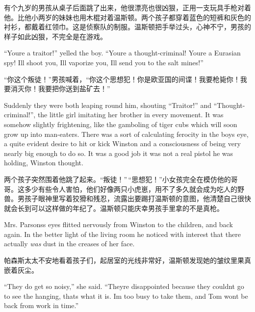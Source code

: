 \begin{paracol}{2}
\switchcolumn

有个九岁的男孩从桌子后面跳了出来，他很漂亮也很凶狠，正用一支玩具手枪对着他。比他小两岁的妹妹也用木棍对着温斯顿。两个孩子都穿着蓝色的短裤和灰色的衬衫，都戴着红领巾。这是侦察队的制服。温斯顿把手举过头，心神不宁，男孩的样子如此凶狠，不完全是在游戏。

\switchcolumn*

``You\textquotesingle re a traitor!'' yelled the boy.
``You\textquotesingle re a thought-criminal! You\textquotesingle re a
Eurasian spy! I\textquotesingle ll shoot you, I\textquotesingle ll
vaporize you, I\textquotesingle ll send you to the salt mines!''

\switchcolumn

``你这个叛徒！''男孩喊着，``你这个思想犯！你是欧亚国的间谍！我要枪毙你！我要消灭你！我要把你送到盐矿去！''

\switchcolumn*

Suddenly they were both leaping round him, shouting ``Traitor!'' and
``Thought-criminal!'', the little girl imitating her brother in every
movement. It was somehow slightly frightening, like the gamboling of
tiger cubs which will soon grow up into man-eaters. There was a sort of
calculating ferocity in the boy\textquotesingle s eye, a quite evident
desire to hit or kick Winston and a consciousness of being very nearly
big enough to do so. It was a good job it was not a real pistol he was
holding, Winston thought.

\switchcolumn

两个孩子突然围着他跳了起来。``叛徒！''\,``思想犯！''小女孩完全在模仿他的哥哥。这多少有些令人害怕，他们好像两只小虎崽，用不了多久就会成为吃人的野兽。男孩子眼神里写着狡猾和残忍，流露出要踢打温斯顿的意图，他清楚自己很快就会长到可以这样做的年纪了。温斯顿只能庆幸男孩手里拿的不是真枪。

\switchcolumn*

Mrs. Parsons\textquotesingle s eyes flitted nervously from Winston to
the children, and back again. In the better light of the living room he
noticed with interest that there actually \emph{was} dust in the creases
of her face.

\switchcolumn

帕森斯太太不安地看着孩子们，起居室的光线非常好，温斯顿发现她的皱纹里果真嵌着灰尘。

\switchcolumn*

``They do get so noisy,'' she said. ``They\textquotesingle re disappointed
because they couldn\textquotesingle t go to see the hanging,
that\textquotesingle s what it is. I\textquotesingle m too busy to take
them, and Tom won\textquotesingle t be back from work in time.''


\end{paracol}
